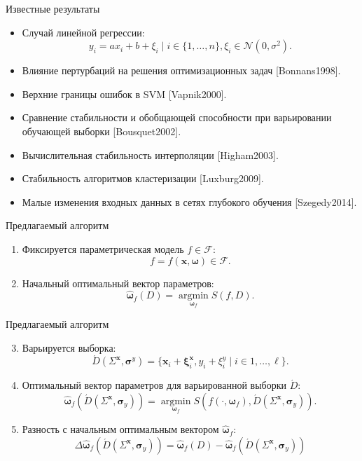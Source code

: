 \documentclass{beamer}
\begin{document}
\begin{frame}{Известные результаты}
  \begin{itemize}
    \item Случай линейной регрессии:
      \[
        y_i = ax_i + b + \xi_i \mid i \in \{ 1, \dots, n \}, \xi_i \in \mathcal{N} (0, \sigma^2).
      \]
    \item Влияние пертурбаций на решения оптимизационных задач [Bonnans1998].
    \item Верхние границы ошибок в SVM [Vapnik2000].
    \item Сравнение стабильности и обобщающей способности при варьировании обучающей выборки [Bousquet2002].
    \item Вычислительная стабильность интерполяции [Higham2003].
    \item Стабильность алгоритмов кластеризации [Luxburg2009].
    \item Малые изменения входных данных в сетях глубокого обучения [Szegedy2014].
  \end{itemize}
\end{frame}

\begin{frame}{Предлагаемый алгоритм}
  \begin{enumerate}
    \item Фиксируется параметрическая модель $f \in \mathcal{F}$:
      \[
        f = f(\mathbf{x}, \boldsymbol{\omega}) \in \mathcal{F}.
      \]
    \item Начальный оптимальный вектор параметров:
      \[
        \hat{\boldsymbol{\omega}}_f(D) = \mathop{\arg \min}\limits_{\boldsymbol{\omega}_f} S(f, D).
      \]
  \end{enumerate}
\end{frame}

\begin{frame}{Предлагаемый алгоритм}
  \begin{enumerate}
    \setcounter{enumi}{2}
    \item Варьируется выборка:
      \[
        \acute{D}(\Sigma^{\mathbf{x}}, \boldsymbol{\sigma}^y) = \{ \mathbf{x}_i + \boldsymbol{\xi}^{\mathbf{x}}_i, y_i + \xi^y_i \mid i \in 1, \dots, \ell \}.
      \]
    \item Оптимальный вектор параметров для варьированной выборки $\acute{D}$:
      \[
    		\hat{\boldsymbol{\omega}}_f (\acute{D} (\Sigma^{\mathbf{x}}, \boldsymbol{\sigma}_y)) = \mathop{\arg \min}\limits_{\boldsymbol{\omega}_f} S (f (\cdot, \boldsymbol{\omega}_f), \acute{D} (\Sigma^{\mathbf{x}}, \boldsymbol{\sigma}_y)).
      \]
    \item Разность с начальным оптимальным вектором $\hat{\boldsymbol{\omega}}_f$:
      \[
        \Delta\hat{\boldsymbol{\omega}}_f(\acute{D} (\Sigma^{\mathbf{x}}, \boldsymbol{\sigma}_y) ) = \hat{\boldsymbol{\omega}}_f(D) - \hat{\boldsymbol{\omega}}_f (\acute{D} (\Sigma^{\mathbf{x}}, \boldsymbol{\sigma}_y))
      \]
   \end{enumerate}
\end{frame}
\end{document}
